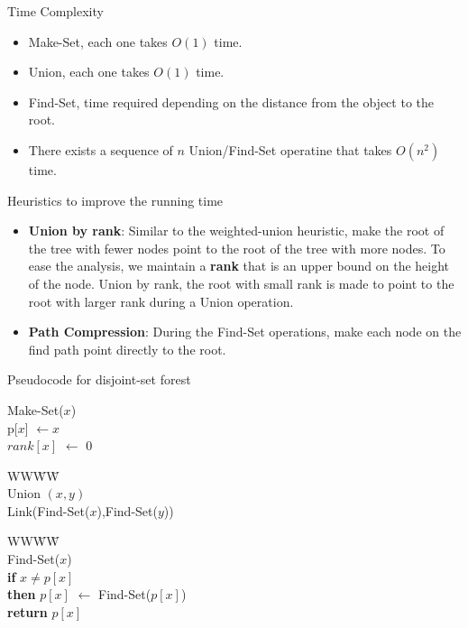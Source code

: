 \documentclass{beamer}
\begin{document}
\begin{frame}{}
\end{frame}

\begin{frame}{}

\centerline{\large Time Complexity}
\begin{itemize}
\item Make-Set, each one takes $O(1)$ time. 
\item Union, each one takes $O(1)$ time.  
\item Find-Set, time required depending on the distance from the object
 to the root.  
\item There exists a sequence of $n$ Union/Find-Set operatine
 that takes $O(n^2)$ time.  
\end{itemize}
\end{frame}

\begin{frame}{}

\centerline{\large Heuristics to improve the running time}
\begin{itemize}
\item {\bf Union by rank}: Similar to the weighted-union heuristic, make the
 root of the tree with fewer nodes point to the root of the tree with more
 nodes. To ease the analysis, we maintain a {\bf rank} that is an
 upper bound on the height of the node.  Union by rank, the root with small
 rank is made to point to the root with larger rank during a {\sc Union}
 operation. 
\item {\bf Path Compression}: During the Find-Set operations, make each node
 on the find path point directly to the root.   
\end{itemize}
\end{frame}

\begin{frame}{}

\centerline{\large Pseudocode for disjoint-set forest}
{\sc Make-Set($x$)} \\
p[$x$] $\leftarrow x$ \\
$rank[x]$ $\leftarrow$ 0\\

\begin{tabbing}
WW\=WW\= \kill \\
{\sc Union $(x,y)$} \\
{\sc Link(Find-Set($x$),Find-Set($y$))} \\ 
\end{tabbing}

\begin{tabbing}
WW\=WW\= \kill \\
{\sc Find-Set($x$)} \\
{\bf if} $x\ne p[x]$ \\
\> {\bf then} $p[x]$ $\leftarrow$ {\sc Find-Set($p[x]$)}\\
{\bf return} $p[x]$
\end{tabbing}
\end{frame}
\end{document}
